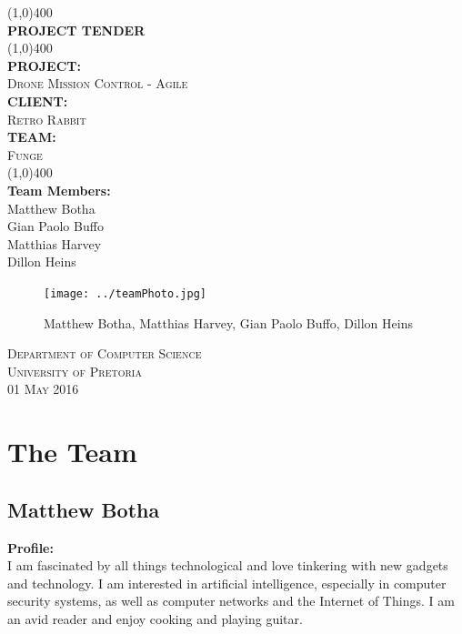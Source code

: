 \documentclass{article}
\begin{document}
\begin{titlepage}
	\begin{center}
		\line(1,0){400}\\
		[6mm]
		\huge{\bfseries PROJECT TENDER}\\
		[2mm]
		\line(1,0){400}\\
		[5mm]
		\large\textbf{PROJECT:}\\\textsc{Drone Mission Control - Agile}\\
		[3mm]
		\large\textbf{CLIENT:}\\\textsc{Retro Rabbit}\\
		[3mm]
		\large \textbf{TEAM:}\\\textsc{Funge}\\
		\line(1,0){400}\\
		[5mm]
		\large \textbf{Team Members:}\\
		[3mm]
		\large Matthew Botha\\
		\large Gian Paolo Buffo\\
		\large Matthias Harvey\\
        \large Dillon Heins\\[3mm]
		\begin{figure}[H]
			\centering
			\texttt{[image: ../teamPhoto.jpg]}
			\caption{Matthew Botha, Matthias Harvey, Gian Paolo Buffo, Dillon Heins}
		\end{figure}
    \end{center}

	\vspace{7mm}

    \begin{flushright}
        \textsc{\large Department of Computer Science\\
        University of Pretoria\\
        01 May 2016\\}
    \end{flushright}
\end{titlepage}

\section{The Team}
\subsection{Matthew Botha}
\textbf{Profile:}\\
I am fascinated by all things technological and love tinkering with new gadgets and technology. I am interested in artificial intelligence, especially in computer security systems, as well as computer networks and the Internet of Things. I am an avid reader and enjoy cooking and playing guitar.
\end{document}
